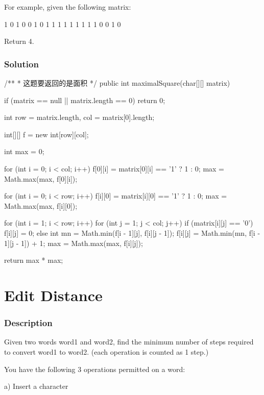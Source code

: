 For example, given the following matrix:
\begin{Code}
1 0 1 0 0
1 0 1 1 1
1 1 1 1 1
1 0 0 1 0
\end{Code}

Return 4.

\subsubsection{Solution}

\begin{Code}
/**
 * 这题要返回的是面积
 */
public int maximalSquare(char[][] matrix) {
    if (matrix == null || matrix.length == 0) {
        return 0;
    }

    int row = matrix.length, col = matrix[0].length;

    int[][] f = new int[row][col];

    int max = 0;

    for (int i = 0; i < col; i++) {
        f[0][i] = matrix[0][i] == '1' ? 1 : 0;
        max = Math.max(max, f[0][i]);
    }

    for (int i = 0; i < row; i++) {
        f[i][0] = matrix[i][0] == '1' ? 1 : 0;
        max = Math.max(max, f[i][0]);
    }

    for (int i = 1; i < row; i++) {
        for (int j = 1; j < col; j++) {
            if (matrix[i][j] == '0') {
                f[i][j] = 0;
            } else {
                int mn = Math.min(f[i - 1][j], f[i][j - 1]);
                f[i][j] = Math.min(mn, f[i - 1][j - 1]) + 1;
                max = Math.max(max, f[i][j]);
            }
        }
    }

    return max * max;
}
\end{Code}

\newpage

\section{Edit Distance} %

\subsubsection{Description}
Given two words word1 and word2, find the minimum number of steps required to convert word1 to word2. (each operation is counted as 1 step.)

You have the following 3 operations permitted on a word:

a) Insert a character

